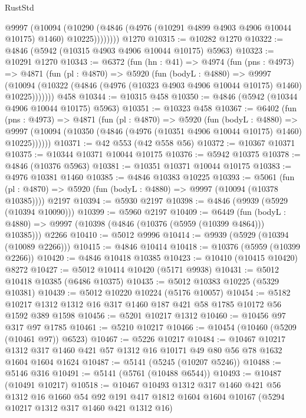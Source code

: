 \begin{lexlean}{RustStd}
\begin{coremodule}
            @9997
              (@10094
                (@10290 (@4846 (@4976 (@10291 @4899 @4903 @4906 @10044 @10175) @1460) @10225))))))))
    @1270
@10315 := @10282 @1270
@10322 := @4846 (@5942 (@10315 @4903 @4906 @10044 @10175) @5963)
@10323 := @10291 @1270
@10343 := @6372
    (fun (hn : @41) =>
    @4974
      (fun (pns : @4973) =>
      @4871
        (fun (pl : @4870) =>
        @5920
          (fun (bodyL : @4880) =>
          @9997
            (@10094 (@10322 (@4846 (@4976 (@10323 @4903 @4906 @10044 @10175) @1460) @10225)))))))
    @458
@10344 := @10315 @458
@10350 := @4846 (@5942 (@10344 @4906 @10044 @10175) @5963)
@10351 := @10323 @458
@10367 := @6402
    (fun (pns : @4973) =>
    @4871
      (fun (pl : @4870) =>
      @5920
        (fun (bodyL : @4880) =>
        @9997 (@10094 (@10350 (@4846 (@4976 (@10351 @4906 @10044 @10175) @1460) @10225))))))
@10371 := @42 @553 (@42 @558 @56)
@10372 := @10367 @10371
@10375 := @10344 @10371 @10044 @10175
@10376 := @5942 @10375
@10378 := @4846 (@10376 @5963)
@10381 := @10351 @10371 @10044 @10175
@10383 := @4976 @10381 @1460
@10385 := @4846 @10383 @10225
@10393 := @5061
    (fun (pl : @4870) => @5920 (fun (bodyL : @4880) => @9997 (@10094 (@10378 @10385))))
    @2197
@10394 := @5930 @2197
@10398 := @4846 (@9939 (@5929 (@10394 @10090)))
@10399 := @5960 @2197
@10409 := @6449
    (fun (bodyL : @4880) => @9997 (@10398 (@4846 (@10376 (@5959 (@10399 @4864))) @10385)))
    @2266
@10410 := @5012 @9996
@10414 := @9939 (@5929 (@10394 (@10089 @2266)))
@10415 := @4846 @10414
@10418 := @10376 (@5959 (@10399 @2266))
@10420 := @4846 @10418 @10385
@10423 := @10410 (@10415 @10420) @8272
@10427 := @5012 @10414 @10420 (@5171 @9938)
@10431 := @5012 @10418 @10385 (@6486 @10375)
@10435 := @5012 @10383 @10225 (@5329 @10381)
@10439 := @5012 @10220 @10224 (@5176 @10057)
@10454 := @5182 @10217 @1312 @1312 @16 @317 @1460 @187 @421 @58 @1785 @10172 @56 @1592 @389 @1598
@10456 := @5201 @10217 @1312
@10460 := @10456 @97 @317 @97 @1785
@10461 := @5210 @10217
@10466 := @10454 (@10460 (@5209 (@10461 @97)) @6523)
@10467 := @5226 @10217
@10484 := @10467
    @10217
    @1312
    @317
    @1460
    @421
    @57
    @1312
    @16
    @10171
    @49
    @80
    @56
    @78
    @1632
    @1604
    @1604
    @1624
@10487 := @5141 (@5245 (@10207 @5246))
@10488 := @5146 @316
@10491 := @5141 (@5761 (@10488 @6544))
@10493 := @10487 (@10491 @10217)
@10518 := @10467
    @10493
    @1312
    @317
    @1460
    @421
    @56
    @1312
    @16
    @1660
    @54
    @92
    @191
    @417
    @1812
    @1604
    @1604
    @10167
    (@5294 @10217 @1312 @317 @1460 @421 @1312 @16)

\end{coremodule}
\end{lexlean}
